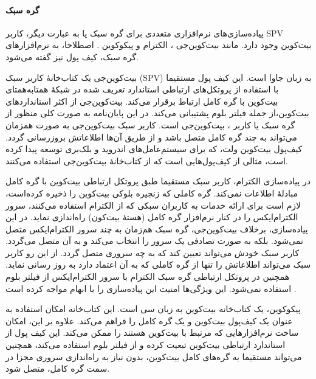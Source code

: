 \paragraph{گره سبک}

پیاده‌سازی‌های نرم‌افزاری متعددی برای گره سبک یا به عبارت دیگر، کاربر SPV بیت‌کوین وجود دارد. مانند بیت‌کوین‌جی \cite{bitcoinj}، الکترام  
\cite{Electrum}
و پیکوکوین
\cite{Garzik}. 
اصطلاحا، به نرم‌افزار‌های گره سبک، کیف پول نیز گفته می‌شود.

بیت‌کوین‌جی یک کتاب‌خانهٔ کاربر سبک (SPV) به زبان جاوا  است. این کیف پول مستقیما با استفاده از پروتکل‌های ارتباطی استاندارد تعریف شده در شبکهٔ همتا‌به‌همتای بیت‌کوین \cite{P2P_dev,P2P_ref} با گره کامل ارتباط برقرار می‌کند. بیت‌کوین‌جی از اکثر استاندارد‌های بیت‌کوین،‌از جمله فیلتر بلوم \cite{Hearn2013}  پشتیبانی می‌کند. در این پایان‌نامه به صورت کلی منظور از گره سبک یا کاربر ، بیت‌کوین‌جی است. کاربر سبک بیت‌کوین‌جی به صورت همزمان می‌تواند به چند گره کامل متصل باشد و از طریق آن‌ها اطلاعاتش بروزرسانی گردد. کیف‌پول‌ 
بیت‌کوین ولت، که برای سیستم‌عامل‌های اندروید و بلک‌بری توسعه پیدا کرده است، مثالی از کیف‌پول‌هایی است که از کتاب‌خانهٔ بیت‌کوین‌جی استفاده می‌کنند.

در پیاده‌سازی الکترام،‌ کاربر سبک مستقیما طبق پروتکل ارتباطی بیت‌کوین با گره کامل مبادلهٔ اطلاعات نمی‌کند. گره کاملی که زنجیره بلوکی بیت‌کوین را ذخیره کرده‌است،‌ لازم است برای ارائه خدمات به کاربران سبکی که از الکترام استفاده می‌کنند،‌ سرور 
الکترام‌ایکس
\cite{ElectrumX}
را در کنار نرم‌افزار گره کامل (هسته‌ٔ بیت‌کون) راه‌اندازی نماید. در این پیاده‌سازی، برخلاف بیت‌کوین‌جی، گره سبک هم‌زمان به چند سرور الکترام‌ایکس متصل نمی‌شود. بلکه به صورت تصادفی یک سرور را انتخاب می‌کند و به آن متصل می‌گردد. کاربر سبک خودش می‌تواند تعیین کند که به چه سروری متصل گردد. از این رو کاربر سبک می‌تواند اطلاعاتش را تنها از گره کاملی که به آن اعتماد دارد به روز رسانی نماید.  همچنین در پروتکل ارتباطی گره سبک الکترام با سرور الکترام‌ایکس از فیلتر بلوم استفاده نمی‌شود. این ویژگی‌ها امنیت این پیاده‌سازی را با ابهام مواجه کرده است \cite{Alison2014}. 

پیکوکوین،‌ یک کتاب‌خانه بیت‌کوین به زبان سی است. این کتاب‌خانه امکان استفاده به عنوان یک کیف‌پول بیت‌کوین و یک گره کامل را فراهم می‌کند. علاوه بر این، امکان ساخت نرم‌افزارهایی که مرتبط با بیت‌کوین هستند را ممکن می‌کند. این کیف پول از استاندارد ارتباطی بیت‌کوین تبعیت کرده و از فیلتر بلوم استفاده می‌کند، همچنین می‌تواند مستقیما به گره‌های کامل بیت‌کوین، بدون نیاز به راه‌اندازی سروری مجزا در سمت گره کامل، متصل شود.

